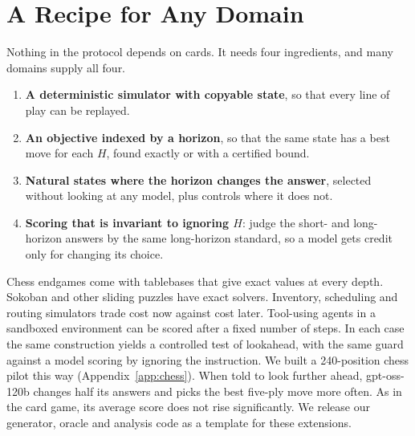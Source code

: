 \section{A Recipe for Any Domain}
\label{sec:recipe}

Nothing in the protocol depends on cards. It needs four ingredients, and many domains supply all four.
\begin{enumerate}
\item \textbf{A deterministic simulator with copyable state}, so that every line of play can be replayed.
\item \textbf{An objective indexed by a horizon}, so that the same state has a best move for each $H$, found exactly or with a certified bound.
\item \textbf{Natural states where the horizon changes the answer}, selected without looking at any model, plus controls where it does not.
\item \textbf{Scoring that is invariant to ignoring $H$}: judge the short- and long-horizon answers by the same long-horizon standard, so a model gets credit only for changing its choice.
\end{enumerate}
Chess endgames come with tablebases that give exact values at every depth. Sokoban and other sliding puzzles have exact solvers. Inventory, scheduling and routing simulators trade cost now against cost later. Tool-using agents in a sandboxed environment can be scored after a fixed number of steps. In each case the same construction yields a controlled test of lookahead, with the same guard against a model scoring by ignoring the instruction. We built a 240-position chess pilot this way (Appendix~\ref{app:chess}). When told to look further ahead, gpt-oss-120b changes half its answers and picks the best five-ply move more often. As in the card game, its average score does not rise significantly. We release our generator, oracle and analysis code as a template for these extensions.
